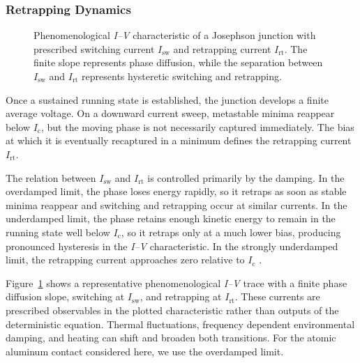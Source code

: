         \subsubsection*{Retrapping Dynamics}

            \begin{figure}
                \captionsetup{format=plain}%
                \centering
                \vspace{-1.5em} %
                \vspace{-0.5em}
                \caption{
                    Phenomenological \textit{I--V} characteristic of a Josephson junction with prescribed switching current $I_\mathrm{sw}$ and retrapping current $I_\mathrm{rt}$. The finite slope represents phase diffusion, while the separation between $I_\mathrm{sw}$ and $I_\mathrm{rt}$ represents hysteretic switching and retrapping.
                }
                \label{fig:macro:rcsj-iv}
            \end{figure}
            Once a sustained running state is established, the junction develops a finite average voltage. On a downward current sweep, metastable minima reappear below $I_\mathrm{c}$, but the moving phase is not necessarily captured immediately. The bias at which it is eventually recaptured in a minimum defines the retrapping current $I_\mathrm{rt}$.

            The relation between $I_\mathrm{sw}$ and $I_\mathrm{rt}$ is controlled primarily by the damping. In the overdamped limit, the phase loses energy rapidly, so it retraps as soon as stable minima reappear and switching and retrapping occur at similar currents. In the underdamped limit, the phase retains enough kinetic energy to remain in the running state well below $I_\mathrm{c}$, so it retraps only at a much lower bias, producing pronounced hysteresis in the \textit{I--V} characteristic. In the strongly underdamped limit, the retrapping current approaches zero relative to $I_\mathrm{c}$ \cite{stewart_currentvoltage_1968,mccumber_effect_1968,tinkham_introduction_2004}.

            Figure~\ref{fig:macro:rcsj-iv} shows a representative phenomenological \textit{I--V} trace with a finite phase diffusion slope, switching at $I_\mathrm{sw}$, and retrapping at $I_\mathrm{rt}$. These currents are prescribed observables in the plotted characteristic rather than outputs of the deterministic equation. Thermal fluctuations, frequency dependent environmental damping, and heating can shift and broaden both transitions. For the atomic aluminum contact considered here, we use the overdamped limit.

